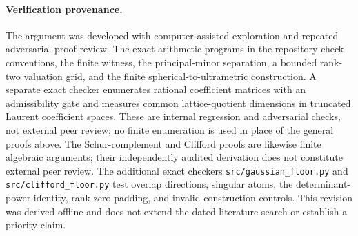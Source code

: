 \documentclass[11pt]{article}
\theoremstyle{remark}
\begin{document}
\paragraph{Verification provenance.}
The argument was developed with computer-assisted exploration and repeated
adversarial proof review.  The exact-arithmetic programs in the repository
check conventions, the finite witness, the principal-minor separation, a
bounded rank-two valuation grid, and the finite spherical-to-ultrametric
construction.  A separate exact checker enumerates rational coefficient
matrices with an admissibility gate and measures common lattice-quotient
dimensions in truncated Laurent coefficient spaces.  These are internal
regression and adversarial checks, not external peer review; no finite
enumeration is used in place of the general proofs above.
The Schur-complement and Clifford proofs are likewise finite algebraic
arguments; their independently audited derivation does not constitute
external peer review.  The additional exact checkers
\texttt{src/gaussian\_floor.py} and \texttt{src/clifford\_floor.py}
test overlap directions, singular atoms, the determinant-power identity,
rank-zero padding, and invalid-construction controls.
This revision was derived offline and does not
extend the dated literature search or establish a priority claim.



\end{document}
